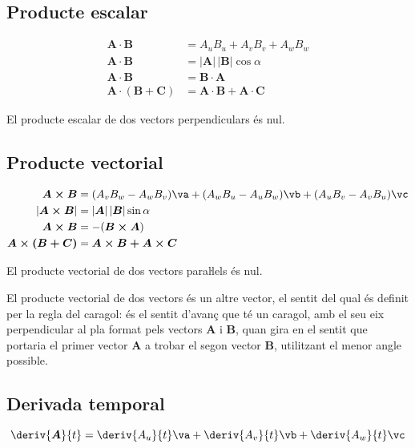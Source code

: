 \documentclass[catalan,a4paper,twoside,11pt]{article}
\begin{document}
\subsection{Producte escalar}

\begin{align}
    \boldsymbol{A\cdot B} &= A_u B_u + A_v B_v + A_w B_w\\
    \boldsymbol{A\cdot B} &=|\boldsymbol{A}| \, |\boldsymbol{B}| \cos\alpha\\
    \boldsymbol{A\cdot B} &=\boldsymbol{B\cdot A}\\
    \boldsymbol{A\cdot(B+C)} &= \boldsymbol{A\cdot B+ A\cdot C}
\end{align}

El producte escalar de dos vectors perpendiculars  és nul.

\subsection{Producte vectorial}

\begin{align}
    \boldsymbol{A\times B} &= (A_v B_w - A_w B_v)\va + (A_w B_u - A_u B_w)\vb +
    (A_u B_v - A_v B_u)\vc \\
    |\boldsymbol{A\times B}| &=|\boldsymbol{A}| \, |\boldsymbol{B}| \sin\alpha\\
    \boldsymbol{A\times B} &=-(\boldsymbol{B\times A})\\
    \boldsymbol{A\times(B+C)} &= \boldsymbol{A\times B+ A\times C}
\end{align}

El producte vectorial de dos vectors paraŀlels  és nul.

El producte vectorial de dos vectors és un altre vector, el
sentit del qual és definit per la regla del caragol: és el sentit
d'avanç que té un caragol, amb el seu eix perpendicular al
pla format pels vectors  $\boldsymbol{A}$ i $\boldsymbol{B}$, quan
gira en el sentit que portaria el primer vector  $\boldsymbol{A}$ a
trobar el segon vector $\boldsymbol{B}$, utilitzant el menor angle
possible.

\subsection{Derivada temporal}
\begin{equation}
    \deriv{\boldsymbol{A}}{t} = \deriv{A_u}{t}\va +
    \deriv{A_v}{t}\vb + \deriv{A_w}{t}\vc
\end{equation}
\end{document}
